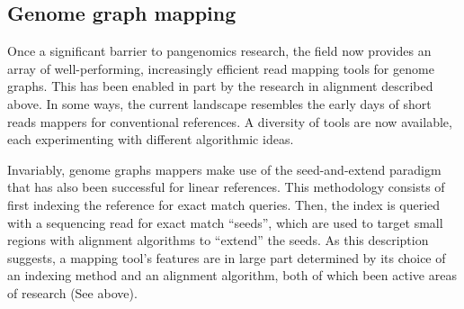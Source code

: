
\subsection{Genome graph mapping}
Once a significant barrier to pangenomics research, the field now provides an array of well-performing, increasingly efficient read mapping tools for genome graphs.
This has been enabled in part by the research in alignment described above.
In some ways, the current landscape resembles the early days of short reads mappers for conventional references. 
A diversity of tools are now available, each experimenting with different algorithmic ideas. 


Invariably, genome graphs mappers make use of the seed-and-extend paradigm that has also been successful for linear references.
This methodology consists of first indexing the reference for exact match queries.
Then, the index is queried with a sequencing read for exact match ``seeds'', which are used to target small regions with alignment algorithms to ``extend'' the seeds. 
As this description suggests, a mapping tool's features are in large part determined by its choice of an indexing method and an alignment algorithm, both of which been active areas of research (See above).



